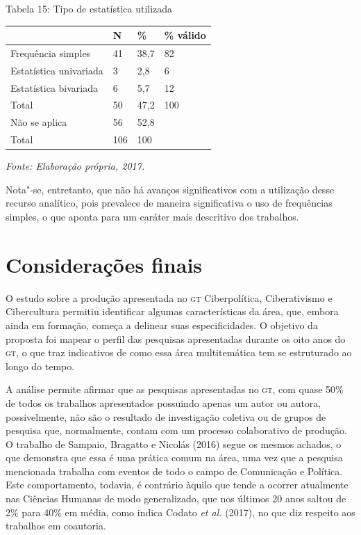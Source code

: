 \begin{center}
Tabela 15: Tipo de estatística utilizada
\end{center}

\begin{center}
\centering
\begin{tabular}{|l|l|l|l|}
\hline
 & \textbf{N} & \textbf{\%} & \textbf{\% válido} \\ \hline
Frequência simples & 41 & 38,7 & 82 \\ \hline
Estatística univariada & 3 & 2,8 & 6 \\ \hline
Estatística bivariada & 6 & 5,7 & 12 \\ \hline
Total & 50 & 47,2 & 100 \\ \hline
Não se aplica & 56 & 52,8 &  \\ \hline
Total & 106 & 100 &  \\ \hline
\end{tabular}
\end{center}

\begin{center}
{\footnotesize\emph{Fonte: Elaboração própria, 2017.}}
\end{center}

Nota"-se, entretanto, que não há avanços significativos com a utilização
desse recurso analítico, pois prevalece de maneira significativa o uso
de frequências simples, o que aponta para um caráter mais descritivo dos
trabalhos.

\section{Considerações finais}

O estudo sobre a produção apresentada no \textsc{gt} Ciberpolítica, Ciberativismo
e Cibercultura permitiu identificar algumas características da área,
que, embora ainda em formação, começa a delinear suas especificidades. O
objetivo da proposta foi mapear o perfil das pesquisas apresentadas
durante os oito anos do \textsc{gt}, o que traz indicativos de como essa área
multitemática tem se estruturado ao longo do tempo.

A análise permite afirmar que as pesquisas apresentadas no \textsc{gt}, com quase
50\% de todos os trabalhos apresentados possuindo apenas um autor ou
autora, possivelmente, não são o resultado de investigação coletiva ou
de grupos de pesquisa que, normalmente, contam com um processo
colaborativo de produção. O trabalho de Sampaio, Bragatto e Nicolás
(2016) segue os mesmos achados, o que demonstra que essa é uma prática
comum na área, uma vez que a pesquisa mencionada trabalha com eventos de
todo o campo de Comunicação e Política. Este comportamento, todavia, é
contrário àquilo que tende a ocorrer atualmente nas Ciências Humanas de
modo generalizado, que nos últimos 20 anos saltou de 2\% para 40\% em
média, como indica Codato \emph{et al.} (2017), no que diz respeito aos
trabalhos em coautoria.


